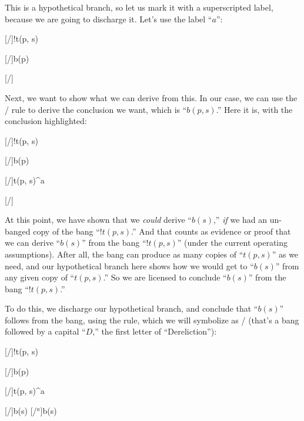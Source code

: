 \documentclass[../../../main.tex]{subfiles}
\begin{document}
\noindent
This is a hypothetical branch, so let us mark it with a superscripted label, because we are going to discharge it. Let's use the label ``$a$'':

\begin{prooftree*}
  \hypo{}
  [\startrule/]{!t(p, s)}

  \hypo{}
  [\startrule/]{b(p)}

  \hypo{}
  [\startrule/]{}
  
\end{prooftree*}

\noindent
Next, we want to show what we can derive from this. In our case, we can use the \traderule/ rule to derive the conclusion we want, which is ``$b(p, s)$.'' Here it is, with the conclusion highlighted:

\begin{prooftree*}
  \hypo{}
  [\startrule/]{!t(p, s)}

  \hypo{}
  [\startrule/]{b(p)}

  \hypo{}
  [\startrule/]{t(p, s)^{a}}
  
  [\traderule/]{}
\end{prooftree*}

\noindent
At this point, we have shown that we \emph{could} derive ``$b(s)$,'' \emph{if} we had an un-banged copy of the bang ``$!t(p, s)$.'' And that counts as evidence or proof that we can derive ``$b(s)$'' from the bang ``$!t(p, s)$'' (under the current operating assumptions). After all, the bang can produce as many copies of ``$t(p, s)$'' as we need, and our hypothetical branch here shows how we would get to ``$b(s)$'' from any given copy of ``$t(p, s)$.'' So we are licensed to conclude ``$b(s)$'' from the bang ``$!t(p, s)$.''

To do this, we discharge our hypothetical branch, and conclude that ``$b(s)$'' follows from the bang, using the  rule, which we will symbolize as \bangDer/ (that's a bang followed by a capital ``$D$,'' the first letter of ``Dereliction''):

\begin{prooftree*}
  \hypo{}
  [\startrule/]{!t(p, s)}

  \hypo{}
  [\startrule/]{b(p)}

  \hypo{}
  [\startrule/]{t(p, s)^{a}}
  
  [\traderule/]{b(s)}
  [\bangDer/$^{a}$]{b(s)}
\end{prooftree*}
\end{document}
